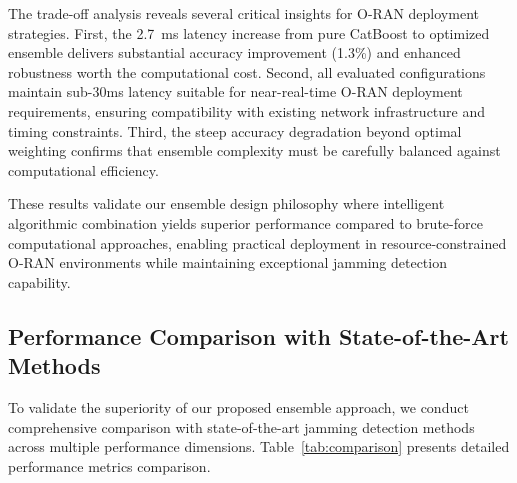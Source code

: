 \documentclass[journal]{IEEEtran}
\begin{document}
The trade-off analysis reveals several critical insights for O-RAN deployment strategies. First, the 2.7~ms latency increase from pure CatBoost to optimized ensemble delivers substantial accuracy improvement (1.3\%) and enhanced robustness worth the computational cost. Second, all evaluated configurations maintain sub-30ms latency suitable for near-real-time O-RAN deployment requirements, ensuring compatibility with existing network infrastructure and timing constraints. Third, the steep accuracy degradation beyond optimal weighting confirms that ensemble complexity must be carefully balanced against computational efficiency.

These results validate our ensemble design philosophy where intelligent algorithmic combination yields superior performance compared to brute-force computational approaches, enabling practical deployment in resource-constrained O-RAN environments while maintaining exceptional jamming detection capability.

\subsection{Performance Comparison with State-of-the-Art Methods}

To validate the superiority of our proposed ensemble approach, we conduct comprehensive comparison with state-of-the-art jamming detection methods across multiple performance dimensions. Table~\ref{tab:comparison} presents detailed performance metrics comparison.
\end{document}
